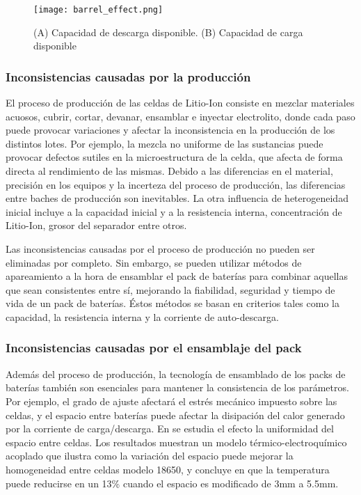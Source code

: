 \begin{figure}[h!]
    \begin{center}
        \texttt{[image: barrel\_effect.png]}
        \caption{(A) Capacidad de descarga disponible. (B) Capacidad de carga
        disponible}
        \label{barrel_effect}
    \end{center}
\end{figure}

\subsubsection{Inconsistencias causadas por la producci\'on}

El proceso de producci\'on de las celdas de Litio-Ion consiste en mezclar
materiales acuosos, cubrir, cortar, devanar, ensamblar e inyectar electrolito,
donde cada paso puede provocar variaciones y afectar la inconsistencia en la
producci\'on de los distintos lotes. Por ejemplo, la mezcla no uniforme de las
sustancias puede provocar defectos sutiles en la microestructura de la celda,
que afecta de forma directa al rendimiento de las mismas. Debido a las
diferencias en el material, precisi\'on en los equipos y la incerteza del
proceso de producci\'on, las diferencias entre baches de producci\'on son
inevitables. La otra influencia de heterogeneidad inicial incluye a la capacidad
inicial y a la resistencia interna, concentraci\'on de Litio-Ion, grosor del
separador entre otros.

Las inconsistencias causadas por el proceso de producci\'on no pueden ser
eliminadas por completo. Sin embargo, se pueden utilizar m\'etodos de
apareamiento a la hora de ensamblar el pack de bater\'ias para combinar aquellas
que sean consistentes entre s\'i, mejorando la fiabilidad, seguridad y tiempo de
vida de un pack de bater\'ias. \'Estos m\'etodos se basan en criterios tales
como la capacidad, la resistencia interna y la corriente de auto-descarga.

\subsubsection{Inconsistencias causadas por el ensamblaje del pack}

Adem\'as del proceso de producci\'on, la tecnolog\'ia de ensamblado de los
packs de bater\'ias tambi\'en son esenciales para mantener la consistencia de
los par\'ametros. Por ejemplo, el grado de ajuste afectar\'a el estr\'es
mec\'anico impuesto sobre las celdas, y el espacio entre bater\'ias puede
afectar la disipaci\'on del calor generado por la corriente de carga/descarga.
En \cite{JI2019113683} se estudia el efecto la uniformidad del espacio entre 
celdas. Los resultados muestran un modelo t\'ermico-electroqu\'imico acoplado que 
ilustra como la variaci\'on del espacio puede mejorar la homogeneidad entre 
celdas modelo 18650, y concluye en que la temperatura puede reducirse en un 13\% 
cuando el espacio es modificado de 3mm a 5.5mm.

